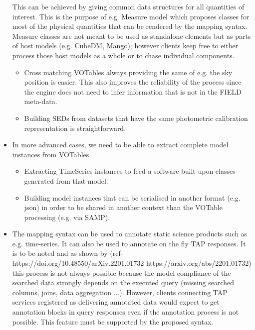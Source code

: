 \begin{itemize}
  This can be achieved by giving  common data structures for all 
  quantities of interest. This is the purpose of e.g. Measure model 
  which proposes classes for most of the physical quantities that can 
  be rendered by the mapping syntax. Measure classes are not meant to 
  be used as standalone elements but as parts of host models 
  (e.g. CubeDM, Mango);
  however clients keep free to either process those host models as a
  whole or to chase individual components.
    \begin{itemize}
      \item Cross matching VOTables always providing the same of e.g. the sky position is easier.
            This also improves the reliability of the process since the engine does not need to infer information that is not in the FIELD meta-data.
      \item Building SEDs from datasets that have the same photometric calibration representation is straightforward.
   \end{itemize}          

  \item In more advanced cases, we need to be able to extract complete model instances from VOTables.
    \begin{itemize}
      \item Extracting  TimeSeries instances to feed a software built upon classes generated from that model.
      \item Building model instances that can be serialised in another format (e.g. json) in order to be shared in another context than 
            the VOTable processing (e.g. via SAMP).
   \end{itemize}         
    
   \item The mapping syntax can be used to annotate static science products such as e.g. time-series. It can also be used to annotate 
   on the fly TAP responses.
   It is to be noted and as shown by (ref- https://doi.org/10.48550/arXiv.2201.01732 https://arxiv.org/abs/2201.01732) this process is not always 
   possible because the model compliance of the searched data strongly depends 
   on the executed query (missing searched columns, joins, data aggregation ...). 
   However, clients connecting TAP services registered as delivering annotated data would expect to get annotation blocks in query responses even 
   if the annotation process is not possible. 
   This feature must be supported by the proposed syntax.
    
\end{itemize} 

